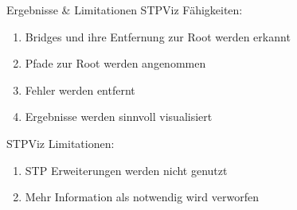\documentclass{beamer}
\begin{document}
\begin{frame}{Ergebnisse \& Limitationen}
    STPViz Fähigkeiten:
    \begin{enumerate}[<+(1)->]
        \item Bridges und ihre Entfernung zur Root werden erkannt
        \item Pfade zur Root werden angenommen
        \item Fehler werden entfernt
        \item Ergebnisse werden sinnvoll visualisiert
    \end{enumerate}
    \pause
    STPViz Limitationen:
    \begin{enumerate}[<+(1)->]
        \item STP Erweiterungen werden nicht genutzt
        \item Mehr Information als notwendig wird verworfen
    \end{enumerate}
\end{frame}
\end{document}
